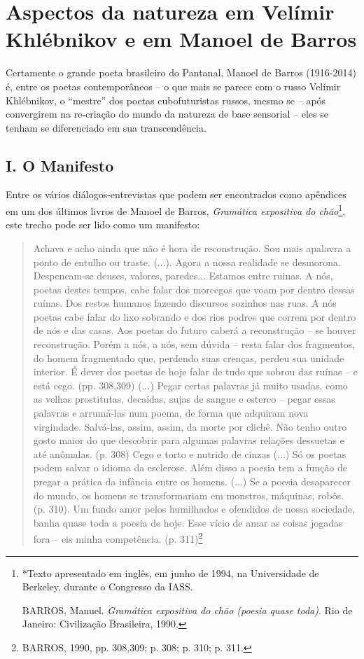 \chapter{Aspectos da natureza em Velímir Khlébnikov e em Manoel de Barros}

Certamente o grande poeta brasileiro do Pantanal, Manoel de Barros
(1916-2014) é, entre os poetas contemporâneos -- o que mais se parece
com o russo Velímir Khlébnikov, o ``mestre'' dos poetas cubofuturistas
russos, mesmo se -- após convergirem na re-criação do mundo da natureza
de base sensorial -- eles se tenham se diferenciado em sua
transcendência.

\section{I. O Manifesto}

Entre os vários diálogos-entrevistas que podem ser encontrados como
apêndices em um dos últimos livros de Manoel de Barros, \emph{Gramática
expositiva do chão}\footnote{*Texto apresentado em inglês, em junho de
  1994, na Universidade de Berkeley, durante o Congresso da IASS.

  BARROS, Manuel. \emph{Gramática expositiva do chão (poesia quase
  toda)}. Rio de Janeiro: Civilização Brasileira, 1990.}, este trecho
pode ser lido como um manifesto:

\begin{quote}
Achava e acho ainda que não é hora de reconstrução. Sou mais apalavra a
ponto de entulho ou traste. (...). Agora a nossa realidade se desmorona.
Despencam-se deuses, valores, paredes... Estamos entre ruinas. A nós,
poetas destes tempos, cabe falar dos morcegos que voam por dentro dessas
ruínas. Dos restos humanos fazendo discursos sozinhos nas ruas. A nós
poetas cabe falar do lixo sobrando e dos rios podres que correm por
dentro de nós e das casas. Aos poetas do futuro caberá a reconstrução --
se houver reconstrução. Porém a nós, a nós, sem dúvida -- resta falar
dos fragmentos, do homem fragmentado que, perdendo suas crenças, perdeu
sua unidade interior. É dever dos poetas de hoje falar de tudo que
sobrou das ruínas -- e está cego. (pp. 308,309) (...) Pegar certas
palavras já muito usadas, como as velhas prostitutas, decaídas, sujas de
sangue e esterco -- pegar essas palavras e arrumá-las num poema, de
forma que adquiram nova virgindade. Salvá-las, assim, assim, da morte
por clichê. Não tenho outro gosto maior do que descobrir para algumas
palavras relações dessuetas e até anômalas. (p. 308) Cego e torto e
nutrido de cinzas (...) Só os poetas podem salvar o idioma da esclerose.
Além disso a poesia tem a função de pregar a prática da infância entre
os homens. (...) Se a poesia desaparecer do mundo, os homens se
transformariam em monstros, máquinas, robôs. (p. 310). Um fundo amor
pelos humilhados e ofendidos de nossa sociedade, banha quase toda a
poesia de hoje. Esse vício de amar as coisas jogadas fora -- eis minha
competência. (p. 311)\footnote{BARROS, 1990, pp. 308,309; p. 308; p.
  310; p. 311.}
\end{quote}

